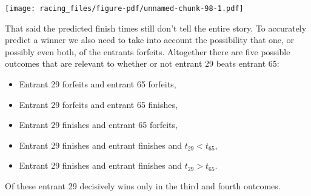 \documentclass[
  letterpaper,
  DIV=11,
  numbers=noendperiod]{scrartcl}
\newenvironment{Shaded}{\begin{snugshade}}{\end{snugshade}}
\newcommand{\AttributeTok}[1]{\textcolor[rgb]{0.40,0.45,0.13}{#1}}
\newcommand{\ConstantTok}[1]{\textcolor[rgb]{0.56,0.35,0.01}{#1}}
\newcommand{\DecValTok}[1]{\textcolor[rgb]{0.68,0.00,0.00}{#1}}
\newcommand{\FloatTok}[1]{\textcolor[rgb]{0.68,0.00,0.00}{#1}}
\newcommand{\FunctionTok}[1]{\textcolor[rgb]{0.28,0.35,0.67}{#1}}
\newcommand{\NormalTok}[1]{\textcolor[rgb]{0.00,0.23,0.31}{#1}}
\newcommand{\SpecialCharTok}[1]{\textcolor[rgb]{0.37,0.37,0.37}{#1}}
\newcommand{\StringTok}[1]{\textcolor[rgb]{0.13,0.47,0.30}{#1}}
\providecommand{\tightlist}{%
  \setlength{\itemsep}{0pt}\setlength{\parskip}{0pt}}\usepackage{longtable,booktabs,array}
\begin{document}
\begin{Shaded}
\end{Shaded}

\texttt{[image: racing\_files/figure-pdf/unnamed-chunk-98-1.pdf]}

That said the predicted finish times still don't tell the entire story.
To accurately predict a winner we also need to take into account the
possibility that one, or possibly even both, of the entrants forfeits.
Altogether there are five possible outcomes that are relevant to whether
or not entrant 29 beats entrant 65:

\begin{itemize}
\tightlist
\item
  Entrant 29 forfeits and entrant 65 forfeits,
\item
  Entrant 29 forfeits and entrant 65 finishes,
\item
  Entrant 29 finishes and entrant 65 forfeits,
\item
  Entrant 29 finishes and entrant finishes and \(t_{29} < t_{65}\),
\item
  Entrant 29 finishes and entrant finishes and \(t_{29} > t_{65}\).
\end{itemize}

Of these entrant 29 decisively wins only in the third and fourth
outcomes.
\end{document}
